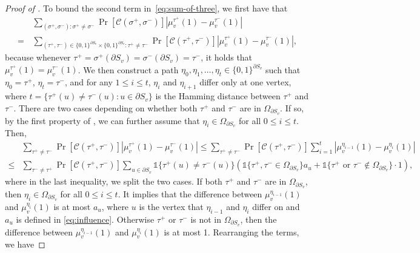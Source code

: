 \documentclass[11pt]{amsart}
\renewcommand{\Pr}{\mathop{\mathrm{Pr}}\nolimits}
\renewcommand{\P}{\Pr}
\theoremstyle{definition}
\theoremstyle{remark}
\begin{document}
\begin{proof}[Proof of ]
To bound the second term in~\eqref{eq:sum-of-three}, we first have that
\begin{align*}
&\sum_{(\sigma^+,\sigma^-):\sigma^+\neq \sigma^-} \Pr[\mathcal{C}(\sigma^+,\sigma^-)] \left | \mu_v^{\tau^+}(1)-\mu_v^{\tau^-}(1)\right |\\
=\,& \sum_{(\tau^+,\tau^-) \in \{0,1\}^{\partial S_v} \times \{0,1\}^{\partial S_v}:\tau^+\neq \tau^-}\P[\mathcal{C}(\tau^+,\tau^-)]\left | \mu_v^{\tau^+}(1)-\mu_v^{\tau^-}(1)\right |,
\end{align*}
because whenever $\tau^+ = \sigma^+(\partial S_v)=\sigma^-(\partial S_v) = \tau^-$, it holds that $\mu_v^{\tau^+}(1) = \mu_v^{\tau^-}(1)$.
We then construct a path $\eta_0,\eta_1,\ldots,\eta_t \in \{0,1\}^{\partial S_v}$ such that $\eta_0 = \tau^+$, $\eta_t = \tau^-$, and for any $1 \leq i \leq t$, $\eta_i$ and $\eta_{i+1}$ differ only at one vertex, where $t = \{\tau^+(u) \neq \tau^-(u): u \in \partial S_v\}$ is the Hamming distance between $\tau^+$ and $\tau^-$.
There are two cases depending on whether both $\tau^+$ and $\tau^-$ are in $\Omega_{\partial S_v}$. 
If so, by the first property of , we can further assume that $\eta_i \in \Omega_{\partial S_v}$ for all $0 \leq i \leq t$.
Then,
\begin{align*}
    &\sum_{\tau^+\neq \tau^-}\P[\mathcal{C}(\tau^+,\tau^-)]\left | \mu_v^{\tau^+}(1)-\mu_v^{\tau^-}(1)\right |\leq \sum_{\tau^+\neq \tau^-}\P[\mathcal{C}(\tau^+,\tau^-)]\sum_{i=1}^{t}\left|\mu_v^{\eta_{i-1}}(1)-\mu_v^{\eta_i}(1) \right|\\
    \leq& \sum_{\tau^-\neq \tau^+}\P[\mathcal{C}(\tau^+,\tau^-)]\sum_{u\in \partial S_v}\mathbb{1}\{\tau^+(u)\neq \tau^-(u) \}(\mathbb{1}\{\tau^+,\tau^-\in \Omega_{\partial S_v}\}a_u+\mathbb{1}\{\tau^+\text{ or }\tau^-\notin \Omega_{\partial S_v}\}\cdot 1),
\end{align*}
where in the last inequality, we split the two cases. 
If both $\tau^+$ and $\tau^-$ are in $\Omega_{\partial S_v}$, then $\eta_i \in \Omega_{\partial S_v}$ for all $0 \leq i \leq t$.
It implies that the difference between $\mu_v^{\eta_{i-1}}(1)$ and $\mu_v^{\eta_i}(1)$ is at most $a_u$, where $u$ is the vertex that $\eta_{i-1}$ and $\eta_{i}$ differ on and $a_u$ is defined in \eqref{eq:influence}. 
Otherwise $\tau^+$ or $\tau^-$ is not in $\Omega_{\partial S_v}$, then the difference between $\mu_v^{\eta_{i-1}}(1)$ and $\mu_v^{\eta_i}(1)$ is at most 1. Rearranging the terms, we have

\end{proof}
\end{document}
